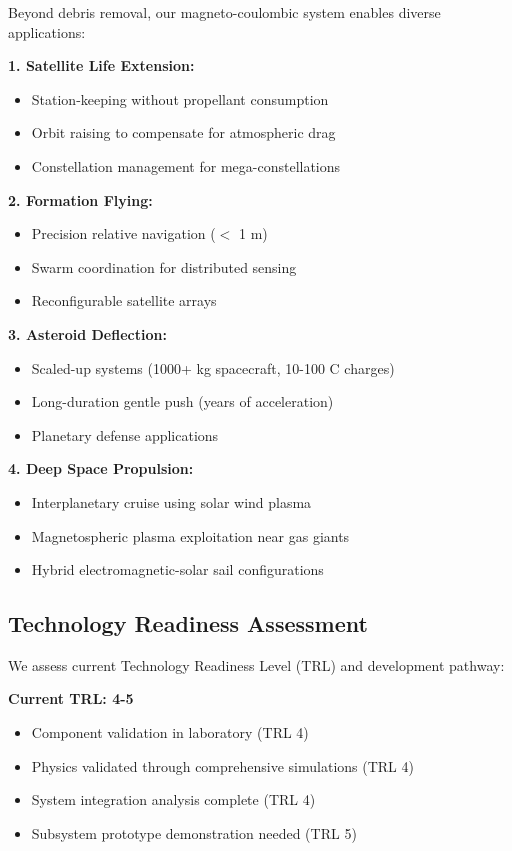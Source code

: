 \documentclass[12pt,a4paper]{article}
\begin{document}
Beyond debris removal, our magneto-coulombic system enables diverse applications:

\textbf{1. Satellite Life Extension:}
\begin{itemize}
\item Station-keeping without propellant consumption
\item Orbit raising to compensate for atmospheric drag
\item Constellation management for mega-constellations
\end{itemize}

\textbf{2. Formation Flying:}
\begin{itemize}
\item Precision relative navigation ($<$ 1 m)
\item Swarm coordination for distributed sensing
\item Reconfigurable satellite arrays
\end{itemize}

\textbf{3. Asteroid Deflection:}
\begin{itemize}
\item Scaled-up systems (1000+ kg spacecraft, 10-100 C charges)
\item Long-duration gentle push (years of acceleration)
\item Planetary defense applications
\end{itemize}

\textbf{4. Deep Space Propulsion:}
\begin{itemize}
\item Interplanetary cruise using solar wind plasma
\item Magnetospheric plasma exploitation near gas giants
\item Hybrid electromagnetic-solar sail configurations
\end{itemize}

\subsection{Technology Readiness Assessment}

We assess current Technology Readiness Level (TRL) and development pathway:

\textbf{Current TRL: 4-5}
\begin{itemize}
\item Component validation in laboratory (TRL 4)
\item Physics validated through comprehensive simulations (TRL 4)
\item System integration analysis complete (TRL 4)
\item Subsystem prototype demonstration needed (TRL 5)
\end{itemize}
\end{document}
